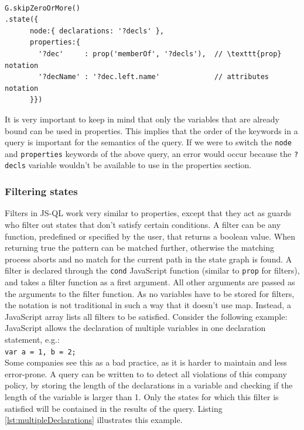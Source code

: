 \begin{lstlisting}[label={lst:propertiesExample},language=JSQL,caption=Specifying additional properties in JS-QL,mathescape=true]  % float=t?

G.skipZeroOrMore()
.state({
      node:{ declarations: '?decls' },
      properties:{
        '?dec'     : prop('memberOf', '?decls'),  // \texttt{prop} notation
        '?decName' : '?dec.left.name'             // attributes notation
      }})
\end{lstlisting}

It is very important to keep in mind that only the variables that are already bound can be used in properties. This implies that the order of the keywords in a query is important for the semantics of the query. If we were to switch the \texttt{node} and \texttt{properties} keywords of the above query, an error would occur because the \texttt{?decls} variable wouldn't be available to use in the properties section.

\subsubsection{Filtering states}

Filters in JS-QL work very similar to properties, except that they act as guards who filter out states that don't satisfy certain conditions. A filter can be any function, predefined or specified by the user, that returns a boolean value. When returning true the pattern can be matched further, otherwise the matching process aborts and no match for the current path in the state graph is found. A filter is declared through the \texttt{cond} JavaScript function (similar to \texttt{prop} for filters), and takes a filter function as a first argument. All other arguments are passed as the arguments to the filter function. As no variables have to be stored for filters, the notation is not traditional in such a way that it doesn't use map. Instead, a JavaScript array lists all filters to be satisfied. Consider the following example: JavaScript allows the declaration of multiple variables in one declaration statement, e.g.:\\\texttt{var a = 1, b = 2;} \\Some companies see this as a bad practice, as it is harder to maintain and less error-prone. A query can be written to to detect all violations of this company policy, by storing the length of the declarations in a variable and checking if the length of the variable is larger than 1. Only the states for which this filter is satisfied will be contained in the results of the query. Listing \ref{lst:multipleDeclarations} illustrates this example.

